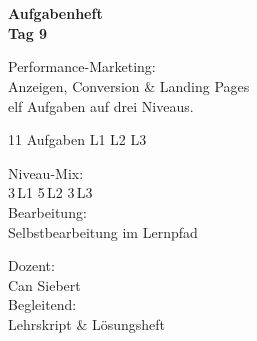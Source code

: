 \documentclass[11pt,a4paper,oneside]{article}
\begin{document}
\begin{titlepage}
  \pagestyle{empty}
  \vspace*{1.5cm}
  \\[2pt]
  \noindent{\color{lpAccent}\rule{\linewidth}{1.2pt}}\\[4pt]

  \vspace{3cm}
  {\sffamily\fontsize{30}{34}\selectfont\bfseries\color{lpInk}Aufgabenheft\\Tag 9\par}

  \vspace{0.7cm}
  {\sffamily\large\color{lpGray}Performance-Marketing:\\Anzeigen, Conversion \& Landing Pages\\\textendash{} elf Aufgaben auf drei Niveaus.\par}

  \vspace{1.5cm}
  {\caveatfont\LARGE\color{lpAmber}11 Aufgaben \textperiodcentered{} L1 \textperiodcentered{} L2 \textperiodcentered{} L3}\par

  \vfill

  \noindent\begin{minipage}{0.55\linewidth}
    {\sffamily\footnotesize\color{lpGray}Niveau-Mix:}\\
    {\sffamily\small\color{lpInk}3\,\textsf{L1} \textperiodcentered{} 5\,\textsf{L2} \textperiodcentered{} 3\,\textsf{L3}}\\[10pt]
    {\sffamily\footnotesize\color{lpGray}Bearbeitung:}\\
    {\sffamily\small\color{lpInk}Selbstbearbeitung im Lernpfad}
  \end{minipage}\hfill
  \begin{minipage}{0.4\linewidth}
    \raggedleft
    {\sffamily\footnotesize\color{lpGray}Dozent:}\\
    {\sffamily\small\color{lpInk}Can Siebert}\\[10pt]
    {\sffamily\footnotesize\color{lpGray}Begleitend:}\\
    {\sffamily\small\color{lpInk}Lehrskript \& Lösungsheft}
  \end{minipage}

  \vspace{0.5cm}
  \noindent{\color{lpAccent}\rule{\linewidth}{0.6pt}}
\end{titlepage}
\end{document}
